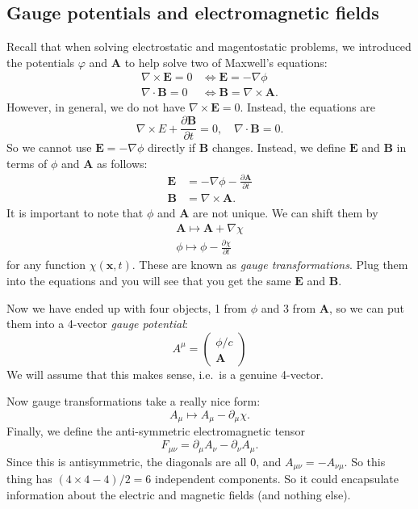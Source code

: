 \documentclass[a4paper]{article}
\begin{document}
\subsection{Gauge potentials and electromagnetic fields}
Recall that when solving electrostatic and magentostatic problems, we introduced the potentials $\varphi$ and $\mathbf{A}$ to help solve two of Maxwell's equations:
\begin{align*}
  \nabla\times \mathbf{E} = 0 &\Leftrightarrow \mathbf{E} = -\nabla \phi\\
  \nabla\cdot \mathbf{B} = 0 &\Leftrightarrow \mathbf{B} = \nabla\times \mathbf{A}.
\end{align*}
However, in general, we do not have $\nabla \times \mathbf{E} = 0$. Instead, the equations are
\[
  \nabla\times E + \frac{\partial \mathbf{B}}{\partial t} = 0,\quad \nabla\cdot \mathbf{B} = 0.
\]
So we cannot use $\mathbf{E} = -\nabla \phi$ directly if $\mathbf{B}$ changes. Instead, we define $\mathbf{E}$ and $\mathbf{B}$ in terms of $\phi$ and $\mathbf{A}$ as follows:
\begin{align*}
  \mathbf{E} &= -\nabla\phi - \frac{\partial \mathbf{A}}{\partial t}\\
  \mathbf{B} &= \nabla\times \mathbf{A}.
\end{align*}
It is important to note that $\phi$ and $\mathbf{A}$ are not unique. We can shift them by
\begin{align*}
  \mathbf{A} \mapsto \mathbf{A} + \nabla \chi\\
  \phi \mapsto \phi - \frac{\partial \chi}{\partial t}
\end{align*}
for any function $\chi(\mathbf{x}, t)$. These are known as \emph{gauge transformations}. Plug them into the equations and you will see that you get the same $\mathbf{E}$ and $\mathbf{B}$.

Now we have ended up with four objects, 1 from $\phi$ and 3 from $\mathbf{A}$, so we can put them into a 4-vector \emph{gauge potential}:
\[
  A^\mu =
  \begin{pmatrix}
    \phi/c\\
    \mathbf{A}
  \end{pmatrix}\]
We will assume that this makes sense, i.e.\ is a genuine 4-vector.

Now gauge transformations take a really nice form:
\[
  A_\mu \mapsto A_\mu - \partial_\mu\chi.
\]
Finally, we define the anti-symmetric electromagnetic tensor
\[
  F_{\mu\nu} = \partial_\mu A_\nu -\partial_\nu A_\mu.
\]
Since this is antisymmetric, the diagonals are all 0, and $A_{\mu\nu} = -A_{\nu\mu}$. So this thing has $(4 \times 4 - 4)/2 = 6$ independent components. So it could encapsulate information about the electric and magnetic fields (and nothing else).
\end{document}
